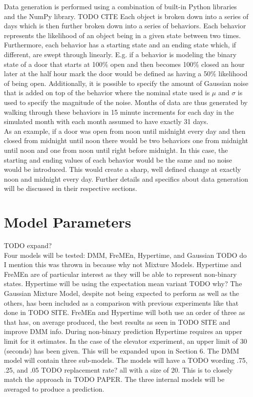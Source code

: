   Data generation is performed using a combination of built-in Python libraries and
  the NumPy library. TODO CITE Each object is broken down into a series of days which is
  then further broken down into a series of behaviors. Each behavior
  represents the likelihood of an object being in a given state between two
  times.  Furthermore, each behavior has a starting state and an ending state
  which, if different, are swept through linearly. E.g. if a behavior is
  modeling the binary state of a door that starts at 100\% open and then becomes
  100\% closed an hour later at the half hour mark the door would be defined as having
  a 50\% likelihood of being open. Additionally, it is possible
  to specify the amount of Gaussian noise that is added on top of the
  behavior where the nominal state used is $\mu$ and $\sigma$ is used to
  specify the magnitude of the noise. Months of data are thus generated by
  walking through these behaviors in 15 minute increments for each day in the
  simulated month with each month assumed to have exactly 31 days. \\

  As an example, if a door was open from noon until midnight every day and then closed from
  midnight until noon there would be two behaviors one from midnight until
  noon and one from noon until right before midnight. In this case, the
  starting and ending values of each behavior would be the same and no noise
  would be introduced. This would create a sharp, well defined change at
  exactly noon and midnight every day. Further details and specifics about data
  generation will be discussed in their respective sections. \\

  \section{ Model Parameters }
  TODO expand? \\

  Four models will be tested: DMM, FreMEn, Hypertime, and Gaussian TODO do I mention this was thrown in because why not
  Mixture Models. Hypertime and FreMEn are of particular interest as they will
  be able to represent non-binary states. Hypertime will be using the
  expectation mean variant TODO why? The Gaussian Mixture Model, despite not
  being expected to perform as well as the others, has been included as a
  comparison with previous experiments like that done in TODO SITE. FreMEn and
  Hypertime will both use an order of three as that has, on average produced,
  the best results as seen in TODO SITE and improve DMM info. During
  non-binary prediction Hypertime requires an upper limit for it estimates. In
  the case of the elevator experiment, an upper limit of 30 (seconds) has been
  given. This will be expanded upon in Section 6. The DMM model will
  contain three sub-models. The models will have a TODO wording .75, .25, and
  .05 TODO replacement rate? all with a size of 20. This is to closely match
  the approach in TODO PAPER. The three internal models will be averaged
  to produce a prediction.\\

